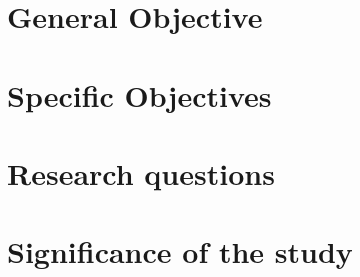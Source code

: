 \section{General Objective}


\section{Specific Objectives}


\section{Research questions}


\section{Significance of the study}
